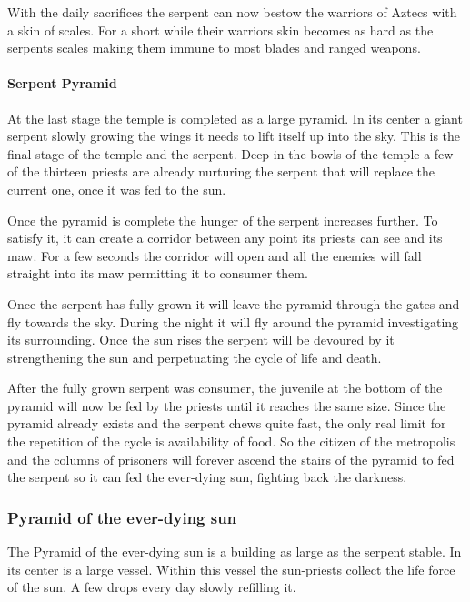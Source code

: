 \documentclass[a4paper]{article}
\begin{document}
				With the daily sacrifices the serpent can now bestow the warriors of \gls{Aztecs}
				with a skin of scales.
				For a short while their warriors skin becomes as hard as the serpents scales
				making them immune to most blades and ranged weapons.

			\paragraph{Serpent Pyramid}
				At the last stage the temple is completed as a large pyramid.
				In its center a giant serpent slowly growing the wings it needs to lift itself up into the sky.
				This is the final stage of the temple and the serpent.
				Deep in the bowls of the temple a few of the thirteen priests are already nurturing
				the serpent that will replace the current one,
				once it was fed to the sun.

				Once the pyramid is complete the hunger of the serpent increases further.
				To satisfy it, it can create a corridor between any point its priests can see
				and its maw.
				For a few seconds the corridor will open and all the enemies will fall straight into
				its maw permitting it to consumer them.

				Once the serpent has fully grown it will leave the pyramid through the gates and fly towards the sky.
				During the night it will fly around the pyramid investigating its surrounding.
				Once the sun rises the serpent will be devoured by it strengthening the sun and perpetuating the cycle
				of life and death.

				After the fully grown serpent was consumer,
				the juvenile at the bottom of the pyramid will now be fed by the priests until it reaches the same size.
				Since the pyramid already exists and the serpent chews quite fast,
				the only real limit for the repetition of the cycle is availability of food.
				So the citizen of the metropolis and the columns of prisoners will forever ascend the stairs
				of the pyramid to fed the serpent so it can fed the ever-dying sun,
				fighting back the darkness.

		\subsubsection{Pyramid of the ever-dying sun}
			The Pyramid of the ever-dying sun is a building as large as the serpent stable.
			In its center is a large vessel.
			Within this vessel the sun-priests collect the life force of the sun.
			A few drops every day slowly refilling it.
\end{document}
